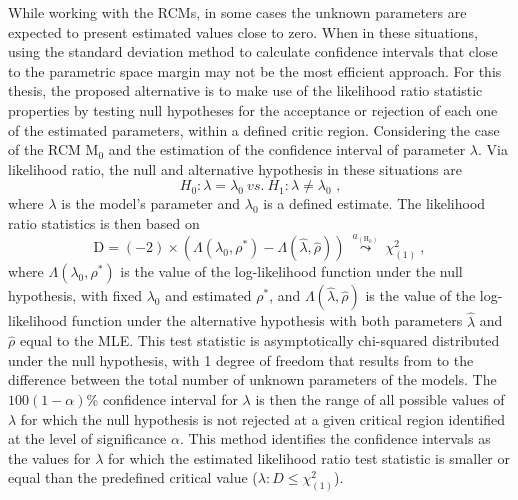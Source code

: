 While working with the RCMs, in some cases the unknown parameters are expected to present estimated values close to zero.
When in these situations, using the standard deviation method to calculate confidence intervals that close to the parametric space margin may not be the most efficient approach.
For this thesis, the proposed alternative is to make use of the likelihood ratio statistic properties by
testing null hypotheses for the acceptance or rejection of each one of the estimated parameters, within a defined critic region.
Considering the case of the RCM M$_0$ and the estimation of the confidence interval of parameter $\lambda$.
Via likelihood ratio, the null and alternative hypothesis in these situations are
%
$$H_0:\lambda=\lambda_0\ \textit{vs.}\ H_1:\lambda \neq \lambda_0\text{\ ,}$$
%
where $\lambda$ is the model's parameter and $\lambda_0$ is a defined estimate.
The likelihood ratio statistics is then based on
%
\begin{equation}
    \text{D}=(-2)\times \left(\Lambda{(\lambda_0,\rho^*)} - \Lambda{(\widehat{\lambda},\widehat{\rho})}\right)\ \overset{a_{\left(\text{H}_0\right)}}{\leadsto}\    \chi_{(1)}^{2}\ ,
\end{equation}
%
\noindent
where $\Lambda{(\lambda_0,\rho^*)}$ is the value of the log-likelihood function under the null hypothesis, with fixed $\lambda_0$ and estimated $\rho^*$, and $\Lambda{(\widehat{\lambda},\widehat{\rho})}$ is the value of the log-likelihood function under the alternative hypothesis with both parameters $\widehat{\lambda}$ and $\widehat{\rho}$ equal to the MLE.
This test statistic is asymptotically chi-squared distributed under the null hypothesis, with 1 degree of freedom that results from to the difference between the total number of unknown parameters of the models.
The $100(1-\alpha)$\% confidence interval for $\lambda$ is then the range of all possible values of $\lambda$ for which the null hypothesis is not rejected at a given critical region
identified at the level of significance $\alpha$.
This method identifies the confidence intervals as the values for $\lambda$ for which the estimated likelihood ratio test statistic is smaller or equal than the predefined critical value ($\lambda: D\leq \chi^2_{(1)}$).
